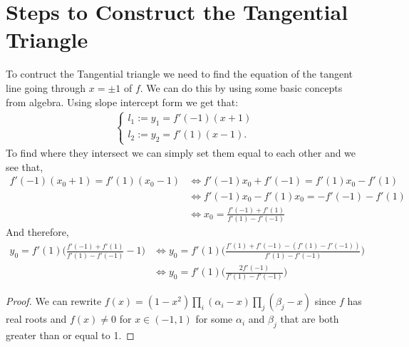 \documentclass[12pt]{extreport}
\begin{document}
\section*{Steps to Construct the Tangential Triangle}
To contruct the Tangential triangle we need to find the equation of the tangent line going through $x = \pm 1$ of $f$. We can do this by using some basic concepts from algebra. Using slope intercept form we get that:
\begin{align*}
\left\{ \begin{array}{lr} l_1 := y_1 = f'(-1)(x+1) \\ l_2 := y_2 = f'(1)(x-1).\end{array} \right.
\end{align*}
To find where they intersect we can simply set them equal to each other and we see that,
\begin{align*}
f'(-1)(x_0+1) = f'(1)(x_0-1) &\iff f'(-1)x_0 + f'(-1) = f'(1)x_0 - f'(1) \\&\iff f'(-1)x_0 - f'(1)x_0 = -f'(-1) - f'(1) \\&\iff x_0 = \frac{f'(-1)+ f'(1)}{f'(1) - f'(-1)} 
\end{align*}
And therefore,
\begin{align*}
y_0 = f'(1) \Big(\frac{f'(-1)+ f'(1)}{f'(1) - f'(-1)} - 1\Big) &\iff
y_0 = f'(1) \Big(\frac{f'(1) + f'(-1) - (f'(1) - f'(-1))}{f'(1)-f'(-1)}\Big) \\&\iff
y_0 = f'(1)\Big(\frac{2f'(-1)}{f'(1)-f'(-1)}\Big)
\end{align*}

\begin{proof}
We can rewrite $f(x) = (1-x^2) \prod_{i}(\alpha_i - x) \prod_{j}(\beta_j - x)$ since $f$ has real roots and $f(x) \neq 0$ for $x \in (-1, 1)$ for some $\alpha_{i}$ and $\beta_{j}$ that are both greater than or equal to 1.
\end{proof}
\end{document}
